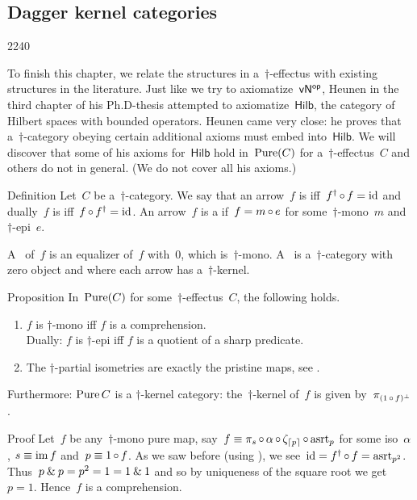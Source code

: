 \subsection{Dagger kernel categories}
\begin{parsec}{2240}%
\begin{point}{10}%
To finish this chapter, we relate the structures in a~$\dagger$-effectus
    with existing structures in the literature.
Just like we try to axiomatize~${\mathsf{vN}}{^{\mathsf{op}}}$,
    Heunen in the third chapter of his Ph.D-thesis attempted
    to axiomatize~$\mathsf{Hilb}$,
    the category of Hilbert spaces with bounded operators.
Heunen came very close:
    he proves that a~$\dagger$-category obeying
    certain additional axioms must embed into~$\mathsf{Hilb}$.
    \cite[3.7.18]{heunenphd}
We will discover that some of his axioms for~$\mathsf{Hilb}$
    hold in~$\operatorname{Pure}(C)$ for a~$\dagger$-effectus~$C$
    and others do not in general.
(We do not cover all his axioms.)
\end{point}
\begin{point}{20}{Definition}%
Let~$C$ be a~$\dagger$-category.
We say that an arrow~$f$
    is 
    iff~$f^\dagger \mathop{\circ} f = \operatorname{id}$
    and dually~$f$ is 
    iff~$f\mathop{\circ} f^\dagger = \operatorname{id}$.
An arrow~$f$ is a 
    if~$f = m \mathop{\circ} e$
    for some~$\dagger$-mono~$m$
    and~$\dagger$-epi~$e$.

A~ of~$f$
is an  equalizer of~$f$ with~$0$, which is~$\dagger$-mono.
A~ is a~$\dagger$-category
    with zero object and where each arrow has a~$\dagger$-kernel.
\cite[3.2.20]{heunenphd}
\end{point}
\begin{point}{30}{Proposition}%
In~$\operatorname{Pure}(C)$ for some~$\dagger$-effectus~$C$,
    the following holds.
\begin{enumerate}
\item
    $f$ is $\dagger$-mono iff $f$ is a comprehension. \\
    Dually:
    $f$ is $\dagger$-epi iff $f$ is a quotient of a sharp predicate.
\item
    The $\dagger$-partial isometries are exactly the pristine maps, see .
\end{enumerate}
Furthermore: $\operatorname{Pure} C$ is a $\dagger$-kernel category:
    the~$\dagger$-kernel of~$f$ is given by~$\pi_{(1 \mathop{\circ} f)^\perp}$.
\begin{point}{40}{Proof}%
Let~$f$ be any~$\dagger$-mono
pure map, say~$f \equiv \pi_s \mathop{\circ} \alpha \mathop{\circ} \zeta_{\left\lceil p\right\rceil}
        \mathop{\circ} \mathrm{asrt}_p$
        for some iso~$\alpha$, $s \equiv \operatorname{im} f$ and~$p \equiv 1 \mathop{\circ} f$.
As we saw before (using ),
    we see~$\operatorname{id} = f^\dagger \mathop{\circ} f = \mathrm{asrt}_{p^2}$.
Thus~$p \mathbin{\&} p = p^2 =  1 = 1 \mathbin{\&} 1$
    and so by uniqueness of the square root
    we get~$p = 1$.
Hence~$f$ is a comprehension.


\end{point}
\end{point}
\end{parsec}
